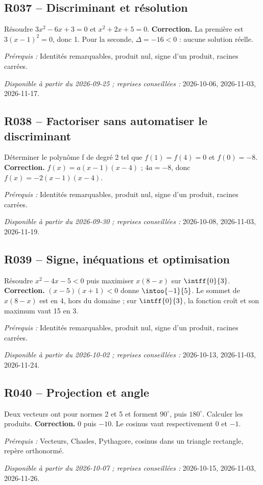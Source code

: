 \subsection*{R037 -- Discriminant et résolution}\label{R037}
Résoudre $3x^2-6x+3=0$ et $x^2+2x+5=0$.
\ifmxteacher\textbf{Correction.} La première est $3(x-1)^2=0$, donc 1. Pour la seconde, $\Delta=-16<0$ : aucune solution réelle.\par\textit{Prérequis :} Identités remarquables, produit nul, signe d’un produit, racines carrées.\par\textit{Disponible à partir du 2026-09-25 ; reprises conseillées :} 2026-10-06, 2026-11-03, 2026-11-17.\fi
{}\subsection*{R038 -- Factoriser sans automatiser le discriminant}\label{R038}
Déterminer le polynôme f de degré 2 tel que $f(1)=f(4)=0$ et $f(0)=-8$.
\ifmxteacher\textbf{Correction.} $f(x)=a(x-1)(x-4)$ ; $4a=-8$, donc $f(x)=-2(x-1)(x-4)$.\par\textit{Prérequis :} Identités remarquables, produit nul, signe d’un produit, racines carrées.\par\textit{Disponible à partir du 2026-09-30 ; reprises conseillées :} 2026-10-08, 2026-11-03, 2026-11-19.\fi
{}\subsection*{R039 -- Signe, inéquations et optimisation}\label{R039}
Résoudre $x^2-4x-5<0$ puis maximiser $x(8-x)$ sur $\intff{0}{3}$.
\ifmxteacher\textbf{Correction.} $(x-5)(x+1)<0$ donne $\intoo{-1}{5}$. Le sommet de $x(8-x)$ est en 4, hors du domaine ; sur $\intff{0}{3}$, la fonction croît et son maximum vaut 15 en 3.\par\textit{Prérequis :} Identités remarquables, produit nul, signe d’un produit, racines carrées.\par\textit{Disponible à partir du 2026-10-02 ; reprises conseillées :} 2026-10-13, 2026-11-03, 2026-11-24.\fi
{}\subsection*{R040 -- Projection et angle}\label{R040}
Deux vecteurs ont pour normes 2 et 5 et forment $90^\circ$, puis $180^\circ$. Calculer les produits.
\ifmxteacher\textbf{Correction.} $0$ puis $-10$. Le cosinus vaut respectivement 0 et $-1$.\par\textit{Prérequis :} Vecteurs, Chasles, Pythagore, cosinus dans un triangle rectangle, repère orthonormé.\par\textit{Disponible à partir du 2026-10-07 ; reprises conseillées :} 2026-10-15, 2026-11-03, 2026-11-26.\fi
